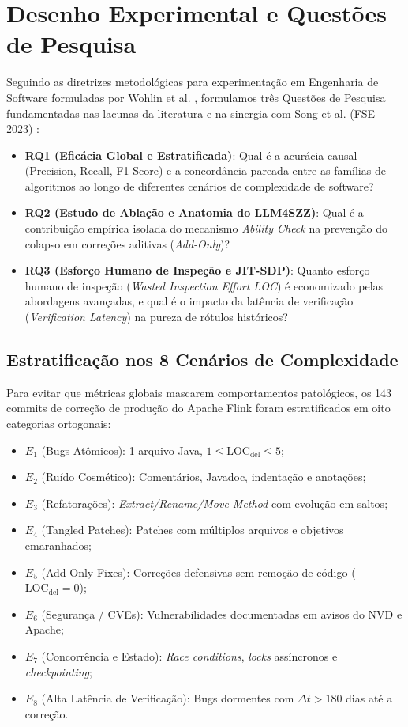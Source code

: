 \documentclass[10pt,journal,compsoc]{IEEEtran}
\begin{document}
\section{Desenho Experimental e Questões de Pesquisa}
Seguindo as diretrizes metodológicas para experimentação em Engenharia de Software formuladas por Wohlin et al. \cite{wohlin2012experimentation}, formulamos três Questões de Pesquisa fundamentadas nas lacunas da literatura e na sinergia com Song et al. (FSE 2023) \cite{song2023practical}:

\begin{itemize}
    \item \textbf{RQ1 (Eficácia Global e Estratificada)}: Qual é a acurácia causal (Precision, Recall, F1-Score) e a concordância pareada entre as famílias de algoritmos ao longo de diferentes cenários de complexidade de software?
    \item \textbf{RQ2 (Estudo de Ablação e Anatomia do LLM4SZZ)}: Qual é a contribuição empírica isolada do mecanismo \textit{Ability Check} na prevenção do colapso em correções aditivas (\textit{Add-Only})?
    \item \textbf{RQ3 (Esforço Humano de Inspeção e JIT-SDP)}: Quanto esforço humano de inspeção (\textit{Wasted Inspection Effort LOC}) é economizado pelas abordagens avançadas, e qual é o impacto da latência de verificação (\textit{Verification Latency}) na pureza de rótulos históricos?
\end{itemize}

\subsection{Estratificação nos 8 Cenários de Complexidade}
Para evitar que métricas globais mascarem comportamentos patológicos, os 143 commits de correção de produção do Apache Flink foram estratificados em oito categorias ortogonais:
\begin{itemize}
    \item $E_1$ (Bugs Atômicos): 1 arquivo Java, $1 \le \text{LOC}_{\text{del}} \le 5$;
    \item $E_2$ (Ruído Cosmético): Comentários, Javadoc, indentação e anotações;
    \item $E_3$ (Refatorações): \textit{Extract/Rename/Move Method} com evolução em saltos;
    \item $E_4$ (Tangled Patches): Patches com múltiplos arquivos e objetivos emaranhados;
    \item $E_5$ (Add-Only Fixes): Correções defensivas sem remoção de código ($\text{LOC}_{\text{del}} = 0$);
    \item $E_6$ (Segurança / CVEs): Vulnerabilidades documentadas em avisos do NVD e Apache;
    \item $E_7$ (Concorrência e Estado): \textit{Race conditions}, \textit{locks} assíncronos e \textit{checkpointing};
    \item $E_8$ (Alta Latência de Verificação): Bugs dormentes com $\Delta t > 180$ dias até a correção.
\end{itemize}
\end{document}
